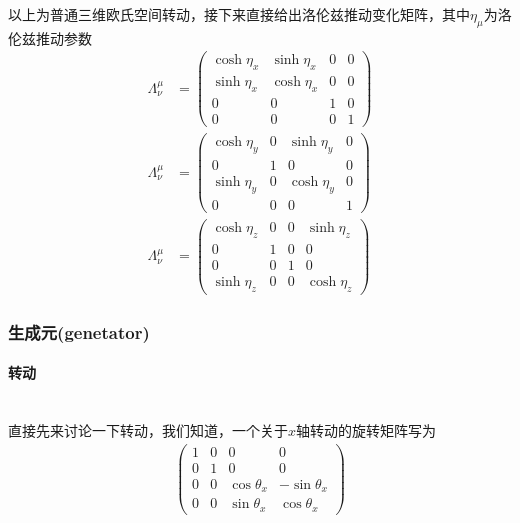 \documentclass{article}
\begin{document}
以上为普通三维欧氏空间转动，接下来直接给出洛伦兹推动变化矩阵，其中$\eta_\mu$为洛伦兹推动参数
\begin{align*}
    \varLambda^\mu_\nu&=
    \begin{pmatrix}
        \cosh{\eta_x}&\sinh{\eta_x}&0&0\\
        \sinh{\eta_x}&\cosh{\eta_x}&0&0\\
        0&0&1&0\\
        0&0&0&1
    \end{pmatrix}\\
    \varLambda^\mu_\nu&=
    \begin{pmatrix}
        \cosh{\eta_y}&0&\sinh{\eta_y}&0\\
        0&1&0&0\\
        \sinh{\eta_y}&0&\cosh{\eta_y}&0\\
        0&0&0&1
    \end{pmatrix}\\
    \varLambda^\mu_\nu&=
    \begin{pmatrix}
        \cosh{\eta_z}&0&0&\sinh{\eta_z}\\
        0&1&0&0\\
        0&0&1&0\\
        \sinh{\eta_z}&0&0&\cosh{\eta_z}
    \end{pmatrix}
\end{align*}

\subsubsection{生成元(genetator)}

\paragraph{转动}\ \\
直接先来讨论一下转动，我们知道，一个关于$x$轴转动的旋转矩阵写为
\begin{align*}
    \begin{pmatrix}
        1&0&0&0\\
        0&1&0&0\\
        0&0&\cos\theta_x&-\sin\theta_x\\
        0&0&\sin\theta_x&\cos\theta_x
    \end{pmatrix}\\
\end{align*}
\end{document}
